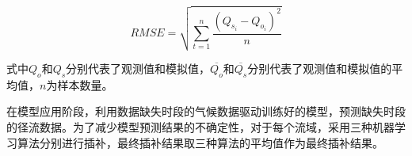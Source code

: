 \begin{equation}
    \label{equ:RMSE}
	RMSE=\sqrt{ \sum_{t=1}^{n}\frac{(Q_{s_i}-Q_{o_i})^2}{n} }  
\end{equation}

式中$Q_o$和$Q_s$分别代表了观测值和模拟值，$\overline{Q_o}$和$\overline{Q_s}$分别代表了观测值和模拟值的平均值，$n$为样本数量。\par
在模型应用阶段，利用数据缺失时段的气候数据驱动训练好的模型，预测缺失时段的径流数据。为了减少模型预测结果的不确定性，对于每个流域，采用三种机器学习算法分别进行插补，最终插补结果取三种算法的平均值作为最终插补结果。\par








